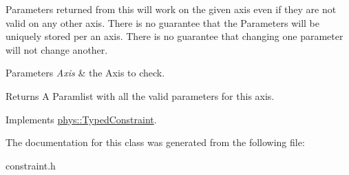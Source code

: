 Parameters returned from this will work on the given axis even if they are not valid on any other axis. There is no guarantee that the Parameters will be uniquely stored per an axis. There is no guarantee that changing one parameter will not change another. 
\begin{DoxyParams}{Parameters}
{\em Axis} & the Axis to check. \\
\hline
\end{DoxyParams}
\begin{DoxyReturn}{Returns}
A Paramlist with all the valid parameters for this axis. 
\end{DoxyReturn}
 

Implements \hyperlink{classphys_1_1TypedConstraint_af9f4c03dbba0d55e60dce341dbdc1105}{phys::TypedConstraint}.



The documentation for this class was generated from the following file:\begin{DoxyCompactItemize}
\item 
constraint.h\end{DoxyCompactItemize}
